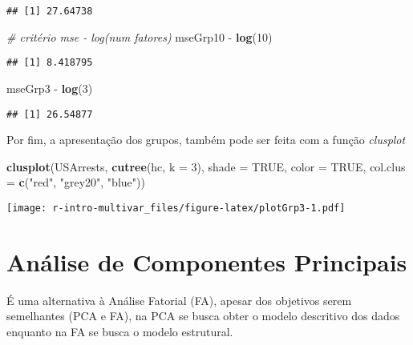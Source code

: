 \documentclass[]{book}
\newenvironment{Shaded}{\begin{snugshade}}{\end{snugshade}}
\newcommand{\KeywordTok}[1]{\textcolor[rgb]{0.13,0.29,0.53}{\textbf{{#1}}}}
\newcommand{\DataTypeTok}[1]{\textcolor[rgb]{0.13,0.29,0.53}{{#1}}}
\newcommand{\DecValTok}[1]{\textcolor[rgb]{0.00,0.00,0.81}{{#1}}}
\newcommand{\StringTok}[1]{\textcolor[rgb]{0.31,0.60,0.02}{{#1}}}
\newcommand{\CommentTok}[1]{\textcolor[rgb]{0.56,0.35,0.01}{\textit{{#1}}}}
\newcommand{\OtherTok}[1]{\textcolor[rgb]{0.56,0.35,0.01}{{#1}}}
\newcommand{\NormalTok}[1]{{#1}}
\begin{document}
\begin{verbatim}
## [1] 27.64738
\end{verbatim}

\begin{Shaded}
\begin{Highlighting}[]
\CommentTok{# critério mse - log(num fatores)}
\NormalTok{mseGrp10 -}\StringTok{ }\KeywordTok{log}\NormalTok{(}\DecValTok{10}\NormalTok{)}
\end{Highlighting}
\end{Shaded}

\begin{verbatim}
## [1] 8.418795
\end{verbatim}

\begin{Shaded}
\begin{Highlighting}[]
\NormalTok{mseGrp3 -}\StringTok{ }\KeywordTok{log}\NormalTok{(}\DecValTok{3}\NormalTok{)}
\end{Highlighting}
\end{Shaded}

\begin{verbatim}
## [1] 26.54877
\end{verbatim}

Por fim, a apresentação dos grupos, também pode ser feita com a função
\emph{clusplot}

\begin{Shaded}
\begin{Highlighting}[]
\KeywordTok{clusplot}\NormalTok{(USArrests, }\KeywordTok{cutree}\NormalTok{(hc, }\DataTypeTok{k =} \DecValTok{3}\NormalTok{), }\DataTypeTok{shade =} \OtherTok{TRUE}\NormalTok{, }\DataTypeTok{color =} \OtherTok{TRUE}\NormalTok{,}
         \DataTypeTok{col.clus =} \KeywordTok{c}\NormalTok{(}\StringTok{"red"}\NormalTok{, }\StringTok{"grey20"}\NormalTok{, }\StringTok{"blue"}\NormalTok{))}
\end{Highlighting}
\end{Shaded}

\texttt{[image: r-intro-multivar\_files/figure-latex/plotGrp3-1.pdf]}

\chapter{Análise de Componentes Principais}\label{PCA}

É uma alternativa à Análise Fatorial (FA), apesar dos objetivos serem
semelhantes (PCA e FA), na PCA se busca obter o modelo descritivo dos
dados enquanto na FA se busca o modelo estrutural.
\end{document}
